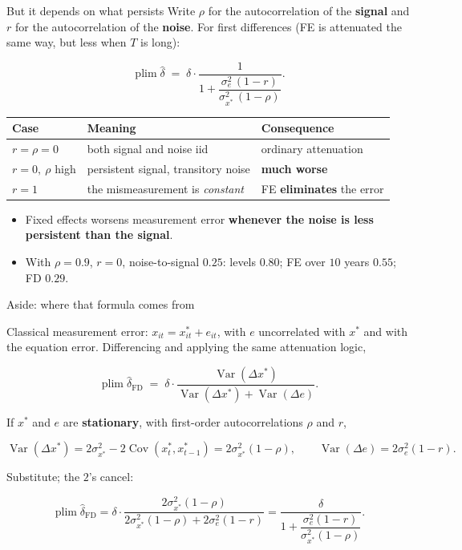 \documentclass[
  11pt,
  ignorenonframetext,
  aspectratio=169,
]{beamer}
\providecommand{\tightlist}{%
  \setlength{\itemsep}{0pt}\setlength{\parskip}{0pt}}
\begin{document}
\begin{frame}{But it depends on what persists}
\protect{}\label{but-it-depends-on-what-persists}
Write \(\rho\) for the autocorrelation of the \textbf{signal} and \(r\)
for the autocorrelation of the \textbf{noise}. For first differences (FE
is attenuated the same way, but less when \(T\) is long):

\[
\operatorname{plim}\hat\delta \;=\; \delta \cdot \frac{1}{1 + \dfrac{\sigma_e^2\,(1-r)}{\sigma_{x^*}^2\,(1-\rho)}} .
\]

\vspace{-0.2em}

\begin{center}\small
\begin{tabular}{lll}
\toprule
Case & Meaning & Consequence \\
\midrule
$r = \rho = 0$   & both signal and noise iid & ordinary attenuation \\
$r = 0,\ \rho$ high & persistent signal, transitory noise & \textbf{much worse}  \\
$r = 1$          & the mismeasurement is \emph{constant} & FE \textbf{eliminates} the error \\
\bottomrule
\end{tabular}
\end{center}

\begin{itemize}
\tightlist
\item
  Fixed effects worsens measurement error \textbf{whenever the noise is
  less persistent than the signal}.
\item
  With \(\rho = 0.9\), \(r = 0\), noise-to-signal \(0.25\): levels
  \(0.80\); FE over \(10\) years \(0.55\); FD \(0.29\).
\end{itemize}
\end{frame}

\begin{frame}{Aside: where that formula comes from}
\protect{}\label{aside-where-that-formula-comes-from}
\small

Classical measurement error: \(x_{it} = x^*_{it} + e_{it}\), with \(e\)
uncorrelated with \(x^*\) and with the equation error. Differencing and
applying the same attenuation logic,

\[
\operatorname{plim}\hat\delta_{\text{FD}} \;=\; \delta \cdot \frac{\operatorname{Var}(\Delta x^*)}{\operatorname{Var}(\Delta x^*) + \operatorname{Var}(\Delta e)} .
\]

If \(x^*\) and \(e\) are \textbf{stationary}, with first-order
autocorrelations \(\rho\) and \(r\),

\[
\operatorname{Var}(\Delta x^*) = 2\sigma^2_{x^*} - 2\operatorname{Cov}(x^*_t, x^*_{t-1}) = 2\sigma^2_{x^*}(1-\rho),
\qquad
\operatorname{Var}(\Delta e) = 2\sigma^2_{e}(1-r).
\]

Substitute; the \(2\)'s cancel:

\[
\operatorname{plim}\hat\delta_{\text{FD}}
= \delta \cdot \frac{2\sigma^2_{x^*}(1-\rho)}{2\sigma^2_{x^*}(1-\rho) + 2\sigma^2_{e}(1-r)}
= \frac{\delta}{1 + \dfrac{\sigma^2_{e}(1-r)}{\sigma^2_{x^*}(1-\rho)}} .
\]
\end{frame}
\end{document}
